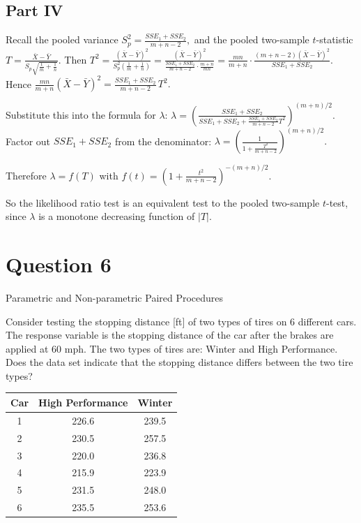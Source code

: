 \documentclass[letterpaper]{article}
\begin{document}
		\clearpage
		
		\subsection{Part IV}
		
		Recall the pooled variance
		$
		S_p^2=\frac{SSE_1+SSE_2}{m+n-2},
		$
		and the pooled two-sample $t$-statistic
		$
		T
		=
		\frac{\bar X-\bar Y}
		{S_p\sqrt{\frac1m+\frac1n}}.
		$
		Then
		$
		T^2
		=
		\frac{(\bar X-\bar Y)^2}
		{S_p^2\left(\frac1m+\frac1n\right)}
		=
		\frac{(\bar X-\bar Y)^2}
		{\frac{SSE_1+SSE_2}{m+n-2}\cdot \frac{m+n}{mn}}
		=
		\frac{mn}{m+n}\cdot \frac{(m+n-2)(\bar X-\bar Y)^2}{SSE_1+SSE_2}.
		$
		Hence
		$
		\frac{mn}{m+n}(\bar X-\bar Y)^2
		=
		\frac{SSE_1+SSE_2}{m+n-2}\,T^2.
		$
		
		Substitute this into the formula for $\lambda$:
		$
		\lambda
		=
		\left(
		\frac{SSE_1+SSE_2}
		{SSE_1+SSE_2+\frac{SSE_1+SSE_2}{m+n-2}T^2}
		\right)^{(m+n)/2}.
		$
		Factor out $SSE_1+SSE_2$ from the denominator:
		$
		\lambda
		=
		\left(
		\frac{1}
		{1+\frac{T^2}{m+n-2}}
		\right)^{(m+n)/2}.
		$
		
		Therefore $\lambda=f(T)$ with
		$
		f(t)=\left(1+\frac{t^2}{m+n-2}\right)^{-(m+n)/2}.
		$
		
		So the likelihood ratio test is an equivalent test to the pooled two-sample $t$-test, since $\lambda$ is a monotone decreasing function of $|T|$.
		
		
		
		
		\clearpage
		
		
		\section{Question 6}
		
		{\color{deepred} Parametric and Non-parametric Paired Procedures}
		
		Consider testing the stopping distance [ft] of two types of tires on 6 different cars. 
		The response variable is the stopping distance of the car after the brakes are applied 
		at 60 mph. The two types of tires are: Winter and High Performance. 
		Does the data set indicate that the stopping distance differs between the two tire types?
		
		\medskip
		
		\begin{center}
			\begin{tabular}{ccc}
				\hline
				Car & High Performance & Winter \\
				\hline
				1 & 226.6 & 239.5 \\
				2 & 230.5 & 257.5 \\
				3 & 220.0 & 236.8 \\
				4 & 215.9 & 223.9 \\
				5 & 231.5 & 248.0 \\
				6 & 235.5 & 253.6 \\
				\hline
			\end{tabular}
		\end{center}
		
\end{document}
